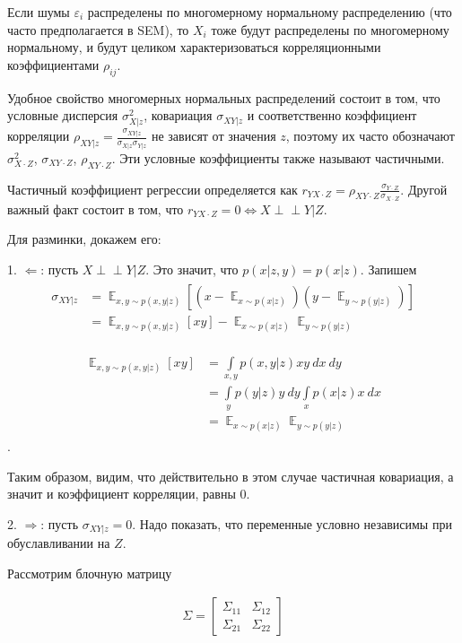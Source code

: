 \documentclass[fleqn]{article}
\DeclareMathOperator{\E}{\mathop\mathbb{E}}
\newcommand{\independent}{\perp \!\!\! \perp}
\numberwithin{equation}{section}
\numberwithin{theorem}{section}
\numberwithin{figure}{section}
\numberwithin{lemma}{section}
\numberwithin{corollary}{section}
\begin{document}
Если шумы $\varepsilon_i$ распределены по многомерному нормальному распределению (что часто предполагается в SEM), то $X_i$ тоже будут распределены по многомерному нормальному, и будут целиком характеризоваться корреляционными коэффициентами $\rho_{ij}$.

Удобное свойство многомерных нормальных распределений состоит в том, что условные дисперсия $\sigma^2_{X|z}$, ковариация $\sigma_{XY|z}$ и соответственно коэффициент корреляции $\rho_{XY|z} = \frac{\sigma_{XY|z}}{\sigma_{X|z}\sigma_{Y|z}}$ не зависят от значения $z$, поэтому их часто обозначают $\sigma^2_{X\cdot Z}$, $\sigma_{XY\cdot Z}$, $\rho_{XY\cdot Z}$. Эти условные коэффициенты также называют частичными.

Частичный коэффициент регрессии определяется как $r_{YX\cdot Z} = \rho_{XY\cdot Z} \frac{\sigma_{Y\cdot Z}}{\sigma_{X\cdot Z}}$. Другой важный факт состоит в том, что $r_{YX\cdot Z} = 0 \Leftrightarrow X \independent Y | Z$.

Для разминки, докажем его: 

1. $\Leftarrow$: пусть $X \independent Y | Z$. Это значит, что $p(x|z,y) = p(x|z)$.
Запишем \begin{align}
	\begin{split}
	\sigma_{XY|z} &= \E_{x,y\sim p(x,y|z)}[(x - \E_{x\sim p(x|z)})(y - \E_{y\sim p(y|z)})] \\&= \E_{x,y\sim p(x,y|z)}[xy] - \E_{x\sim p(x|z)}\E_{y\sim p(y|z)}
\end{split}
\end{align}

\begin{align}
\begin{split}
	 \E_{x,y\sim p(x,y|z)}[xy]&= \int\limits_{x,y}p(x,y|z)xy\ dx\ dy \\&=  \int\limits_{y}p(y|z)y\ dy \int\limits_{x}p(x|z)x\ dx \\
	 &=  \E_{x\sim p(x|z)}\E_{y\sim p(y|z)}
	\end{split}
\end{align}.

Таким образом, видим, что действительно в этом случае частичная ковариация, а значит и коэффициент корреляции, равны 0.

2. $\Rightarrow$: пусть $\sigma_{XY|z} = 0$. Надо показать, что переменные условно независимы при обуславливании на $Z$. 

Рассмотрим блочную матрицу  

\begin{align}
\Sigma = \begin{bmatrix}
	\Sigma_{11}       & \Sigma_{12} \\
	\Sigma_{21}       & \Sigma_{22}
\end{bmatrix}
\end{align}
\end{document}

